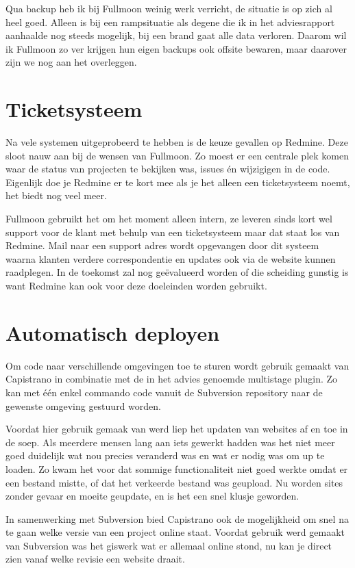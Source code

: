 Qua backup heb ik bij Fullmoon weinig werk verricht, de situatie is op zich al heel goed. Alleen is bij een rampsituatie als degene die ik in het adviesrapport aanhaalde nog steeds mogelijk, bij een brand gaat alle data verloren. Daarom wil ik Fullmoon zo ver krijgen hun eigen backups ook offsite bewaren, maar daarover zijn we nog aan het overleggen. 

\section{Ticketsysteem}

Na vele systemen uitgeprobeerd te hebben is de keuze gevallen op Redmine. Deze sloot nauw aan bij de wensen van Fullmoon. Zo moest er een centrale plek komen waar de status van projecten te bekijken was, issues én wijzigigen in de code. Eigenlijk doe je Redmine er te kort mee als je het alleen een ticketsysteem noemt, het biedt nog veel meer.

Fullmoon gebruikt het om het moment alleen intern, ze leveren sinds kort wel support voor de klant met behulp van een ticketsysteem maar dat staat los van Redmine. Mail naar een support adres wordt opgevangen door dit systeem waarna klanten verdere correspondentie en updates ook via de website kunnen raadplegen. In de toekomst zal nog geëvalueerd worden of die scheiding gunstig is want Redmine kan ook voor deze doeleinden worden gebruikt.

\section{Automatisch deployen}

Om code naar verschillende omgevingen toe te sturen wordt gebruik gemaakt van Capistrano in combinatie met de in het advies genoemde multistage plugin. Zo kan met één enkel commando code vanuit de Subversion repository naar de gewenste omgeving gestuurd worden.

Voordat hier gebruik gemaak van werd liep het updaten van websites af en toe in de soep. Als meerdere mensen lang aan iets gewerkt hadden was het niet meer goed duidelijk wat nou precies veranderd was en wat er nodig was om up te loaden. Zo kwam het voor dat sommige functionaliteit niet goed werkte omdat er een bestand mistte, of dat het verkeerde bestand was geupload. Nu worden sites zonder gevaar en moeite geupdate, en is het een snel klusje geworden.

In samenwerking met Subversion bied Capistrano ook de mogelijkheid om snel na te gaan welke versie van een project online staat. Voordat gebruik werd gemaakt van Subversion was het giswerk wat er allemaal online stond, nu kan je direct zien vanaf welke revisie een website draait.
